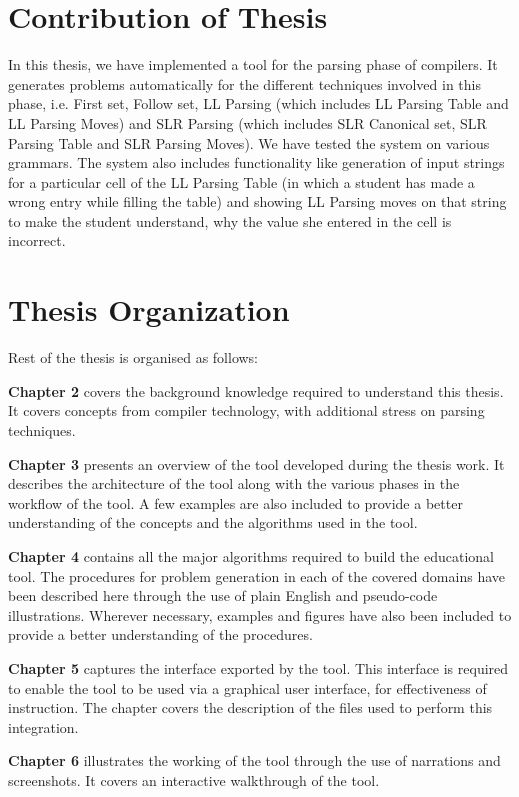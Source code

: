 \section{Contribution of Thesis}
\label{contribution}
In this thesis, we have implemented a tool for the parsing phase of compilers. It generates problems automatically for the different techniques involved in this phase, i.e. First set, Follow set, LL Parsing (which includes LL Parsing Table and LL Parsing Moves) and SLR Parsing (which includes SLR Canonical set, SLR Parsing Table and SLR Parsing Moves). We have tested the system on various grammars. The system also includes functionality like generation of input strings for a particular cell of the LL Parsing Table (in which a student has made a wrong entry while filling the table) and showing LL Parsing moves on that string to make the student understand, why the value she entered in the cell is incorrect.

\section{Thesis Organization}
\label{organization}
Rest of the thesis is organised as follows:

\textbf{Chapter 2} covers the background knowledge required to understand this thesis. It covers concepts from compiler technology, with additional stress on parsing techniques. 

\textbf{Chapter 3} presents an overview of the tool developed during the thesis work. It describes the architecture of the tool along with the various phases in the workflow of the tool. A few examples are also included to provide a better understanding of the concepts and the algorithms used in the tool.

\textbf{Chapter 4} contains all the major algorithms required to build the educational tool. The procedures for problem generation in each of the covered domains have been described here through the use of plain English and pseudo-code illustrations. Wherever necessary, examples and figures have also been included to provide a better understanding of the procedures.

\textbf{Chapter 5} captures the interface exported by the tool. This interface is required to enable the tool to be used via a graphical user interface, for effectiveness of instruction. The chapter covers the description of the files used to perform this integration.

\textbf{Chapter 6} illustrates the working of the tool through the use of narrations and screenshots. It covers an interactive walkthrough of the tool.